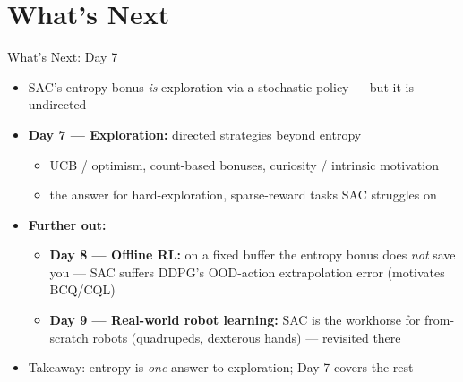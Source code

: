 \section{What's Next}
\begin{frame}{What's Next: Day 7}
\begin{itemize}
    \item SAC's entropy bonus \emph{is} exploration via a stochastic policy --- but it is undirected
    \item \textbf{Day 7 --- Exploration:} directed strategies beyond entropy
    \begin{itemize}
        \item UCB / optimism, count-based bonuses, curiosity / intrinsic motivation
        \item the answer for hard-exploration, sparse-reward tasks SAC struggles on
    \end{itemize}
    \item \textbf{Further out:}
    \begin{itemize}
        \item \textbf{Day 8 --- Offline RL:} on a fixed buffer the entropy bonus does \emph{not} save you --- SAC suffers DDPG's OOD-action extrapolation error (motivates BCQ/CQL)
        \item \textbf{Day 9 --- Real-world robot learning:} SAC is the workhorse for from-scratch robots (quadrupeds, dexterous hands) --- revisited there
    \end{itemize}
    \item Takeaway: entropy is \emph{one} answer to exploration; Day 7 covers the rest
\end{itemize}
\end{frame}
